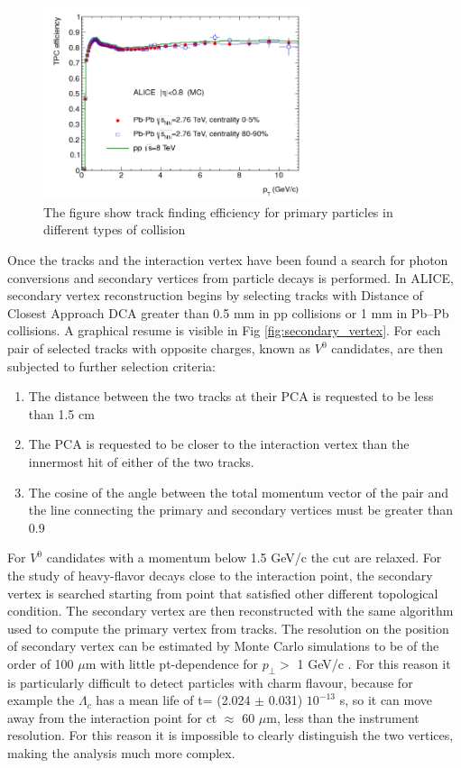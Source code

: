 \documentclass[12pt,a4paper]{book}
\begin{document}
\begin{figure}[h]
	\centering
	\includegraphics[width=0.7\textwidth]{pictures/track_finding_efficiency.png}
	\caption{The figure show track finding efficiency for primary particles in different types of collision \cite{ALICE:2014sbxFs}}
	\label{fig:track_finding_efficiency}
\end{figure}


Once the tracks and the interaction vertex have been found a search for photon conversions and secondary vertices from particle decays is performed. In ALICE, secondary vertex reconstruction begins by selecting tracks with Distance of Closest Approach DCA greater than 0.5 mm in pp collisions or 1 mm in Pb–Pb collisions. A graphical resume is visible in Fig \ref{fig:secondary_vertex}. For each pair of selected tracks with opposite charges, known as $V^0$ candidates, are then subjected to further selection criteria: 
\begin{enumerate}
	\item The distance between the two tracks at their PCA is requested to be less than 1.5 cm
	\item The PCA is requested to be closer to the interaction vertex than the innermost hit of either of the two tracks.
	\item The cosine of the angle between the total momentum vector of the pair and the line connecting the primary and secondary vertices must be greater than 0.9
\end{enumerate} 
For $V^0$ candidates with a momentum below 1.5 GeV/c the cut are relaxed. For the study of heavy-flavor decays close to the interaction point, the secondary vertex is searched starting from point that satisfied other different topological condition. \cite{ALICE:2014sbxFs} The secondary vertex are then reconstructed with the same algorithm used to compute the primary vertex from tracks. The resolution on the position of secondary vertex can be estimated by Monte Carlo simulations to be of the order of 100 $\mu$m with little pt-dependence for $p_\perp >$ 1 GeV/c \cite{2012}. For this reason it is particularly difficult to detect particles with charm flavour, because for example the $\Lambda_c$ has a mean life of t= (2.024 $\pm$ 0.031) $10^{-13}$ s, so it can move away from the interaction point for ct $\approx$ 60 $\mu$m, less than the instrument resolution. For this reason it is impossible to clearly distinguish the two vertices, making the analysis much more complex.
	
\end{document}
